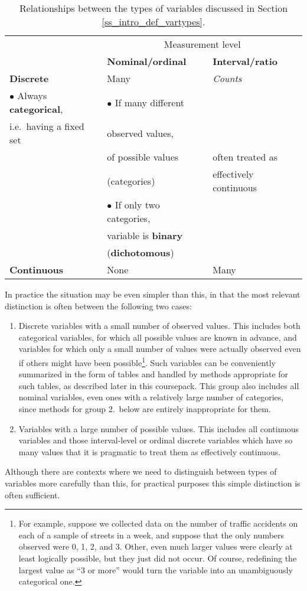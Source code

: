 \begin{table}
\caption{Relationships between the types of variables discussed in
Section
\ref{ss_intro_def_vartypes}.}
\label{t_vartypes}

\begin{tabular}{l|l|l|}
\multicolumn{1}{l}{ }
& \multicolumn{2}{c}{Measurement level} \\
\multicolumn{1}{l}{ }
& \multicolumn{1}{l}{\textbf{Nominal/ordinal}} &
\multicolumn{1}{l}{\textbf{Interval/ratio}} \\ \cline{2-3}
\textbf{Discrete} &
Many & \emph{Counts} \\
$\bullet$ Always \textbf{categorical}, &
$\bullet$ If many different \\
i.e.\ having a fixed set &
observed values, \\
&
of possible values &
often treated as \\
&
(categories) &
effectively continuous \\
&
$\bullet$ If only two categories, & \\
&
variable is \textbf{binary} & \\
&
(\textbf{dichotomous}) & \\ \cline{2-3}
\textbf{Continuous} & None & Many \\
\cline{2-3}
\end{tabular}
\end{table}


In practice the situation may be even simpler than this, in that
the most relevant distinction is often between the following two
cases:\label{p_2_variable_types}
\begin{enumerate}
\item
Discrete variables with a small number of observed values. This includes
both categorical variables, for which all possible values are known in
advance, and variables for which only a small number of values were
actually observed even if others might have been possible\footnote{
For example, suppose we collected data on the number of traffic
accidents on each of a sample of streets in a week, and suppose
that the only numbers observed were 0, 1, 2, and 3. Other,
even much larger values were clearly at least logically possible, but
they just did not occur. Of course, redefining the largest value as ``3
or more'' would turn the variable into an unambiguously
categorical one.}.
Such variables can be conveniently summarized
in the form of tables and handled by methods appropriate for such
tables, as described later in this coursepack.
This group also includes all nominal variables,
even ones with a relatively large number of categories, since methods
for group 2.\ below are entirely inappropriate for them.
\item
Variables with a large number of possible values. This includes all
continuous variables and those interval-level or ordinal discrete
variables which have so many values that it is pragmatic to treat them as effectively
continuous.
\end{enumerate}
Although there are contexts where we need to distinguish between types
of variables more carefully than this, for practical purposes
this simple distinction is often sufficient.

